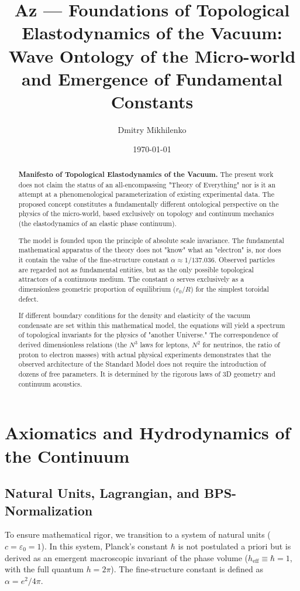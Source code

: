 \documentclass[11pt,a4paper]{article}
\title{\textbf{Az — Foundations of Topological\\ Elastodynamics of the Vacuum:\\ Wave Ontology of the Micro-world and Emergence of Fundamental Constants}}
\author{Dmitry Mikhilenko}
\date{\today}
\begin{document}
	
	\maketitle
	
	\begin{abstract}
		\textbf{Manifesto of Topological Elastodynamics of the Vacuum.} 
		The present work does not claim the status of an all-encompassing "Theory of Everything" nor is it an attempt at a phenomenological parameterization of existing experimental data. The proposed concept constitutes a fundamentally different ontological perspective on the physics of the micro-world, based exclusively on topology and continuum mechanics (the elastodynamics of an elastic phase continuum).
		
		The model is founded upon the principle of absolute scale invariance. The fundamental mathematical apparatus of the theory does not "know" what an "electron" is, nor does it contain the value of the fine-structure constant $\alpha \approx 1/137.036$. Observed particles are regarded not as fundamental entities, but as the only possible topological attractors of a continuous medium. The constant $\alpha$ serves exclusively as a dimensionless geometric proportion of equilibrium ($r_0/R$) for the simplest toroidal defect. 
		
		If different boundary conditions for the density and elasticity of the vacuum condensate are set within this mathematical model, the equations will yield a spectrum of topological invariants for the physics of "another Universe." The correspondence of derived dimensionless relations (the $N^3$ laws for leptons, $N^2$ for neutrinos, the ratio of proton to electron masses) with actual physical experiments demonstrates that the observed architecture of the Standard Model does not require the introduction of dozens of free parameters. It is determined by the rigorous laws of 3D geometry and continuum acoustics.
	\end{abstract}
	
	\section{Axiomatics and Hydrodynamics of the Continuum}
	
	\subsection{Natural Units, Lagrangian, and BPS-Normalization}
	To ensure mathematical rigor, we transition to a system of natural units ($c = \varepsilon_0 = 1$). In this system, Planck's constant $\hbar$ is not postulated a priori but is derived as an emergent macroscopic invariant of the phase volume ($h_{\text{eff}} \equiv \hbar = 1$, with the full quantum $h = 2\pi$). The fine-structure constant is defined as $\alpha = e^2 / 4\pi$.
	
\end{document}
